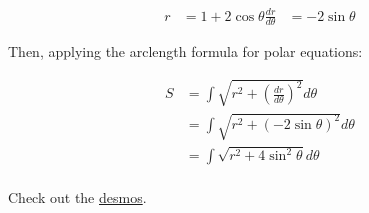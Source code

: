 \documentclass[letterpaper]{article}
\begin{document}
\[\begin{aligned}
  r &= 1 + 2 \cos  \theta 
  \frac{dr}{d\theta } &= - 2 \sin  \theta 
  \end{aligned}\]

Then, applying the arclength formula for polar equations:

\[\begin{aligned}
  S &= \int \sqrt{r^2 + \left( \frac{dr}{d\theta } \right)  ^2} d\theta \\
  &=  \int \sqrt{r^2 + \left( -2 \sin  \theta  \right)  ^2} d\theta \\
  &=  \int \sqrt{r^2 + 4 \sin^2 \theta } d\theta \\
  \end{aligned}\]

Check out the \href{https://www.desmos.com/calculator/gfaoi1he0p}{desmos}.
\end{document}
